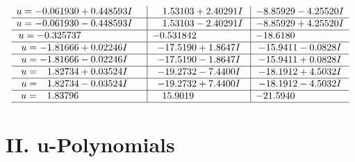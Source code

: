 \documentclass[1p]{elsarticle_modified}
\theoremstyle{definition}
\begin{document}
$$\begin{array}{c|c|c}
\begin{aligned}
u &= -0.061930 + 0.448593 I\end{aligned}
 & \phantom{-}1.53103 + 2.40291 I & -8.85929 - 4.25520 I \\ \hline\begin{aligned}
u &= -0.061930 - 0.448593 I\end{aligned}
 & \phantom{-}1.53103 - 2.40291 I & -8.85929 + 4.25520 I \\ \hline\begin{aligned}
u &= -0.325737\phantom{ +0.000000I}\end{aligned}
 & -0.531842\phantom{ +0.000000I} & -18.6180\phantom{ +0.000000I} \\ \hline\begin{aligned}
u &= -1.81666 + 0.02246 I\end{aligned}
 & -17.5190 + 1.8647 I & -15.9411 - 0.0828 I \\ \hline\begin{aligned}
u &= -1.81666 - 0.02246 I\end{aligned}
 & -17.5190 - 1.8647 I & -15.9411 + 0.0828 I \\ \hline\begin{aligned}
u &= \phantom{-}1.82734 + 0.03524 I\end{aligned}
 & -19.2732 - 7.4400 I & -18.1912 + 4.5032 I \\ \hline\begin{aligned}
u &= \phantom{-}1.82734 - 0.03524 I\end{aligned}
 & -19.2732 + 7.4400 I & -18.1912 - 4.5032 I \\ \hline\begin{aligned}
u &= \phantom{-}1.83796\phantom{ +0.000000I}\end{aligned}
 & \phantom{-}15.9019\phantom{ +0.000000I} & -21.5940\phantom{ +0.000000I}\\
 \hline 
 \end{array}$$\newpage
\newpage\renewcommand{\arraystretch}{1}
\centering \section*{ II. u-Polynomials}
\end{document}
